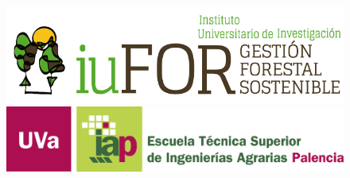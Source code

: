 \begin{titlepage}
\begin{center}
  \end{center}

  \begin{figure}[]
    
    \centering
    \includegraphics[scale=0.273]{./imagenes/iuFOR.png}  
    \includegraphics[scale=1.5]{./imagenes/etsiiaa.png}
  \end{figure}

\end{titlepage}


